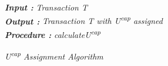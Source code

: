 %
\begin{algorithm}
\textbf{\emph{Input :}} \emph{Transaction T}\\
 \textbf{\emph{Output : }}\emph{Transaction T with U\textsuperscript{cap} assigned} \\
 \textbf{\emph{Procedure : }}\emph{calculateU\textsuperscript{cap}}\\
 \caption{\emph{U\textsuperscript{cap} Assignment Algorithm} }
 \label{algorithm:cap_assignment}
\end{algorithm}

